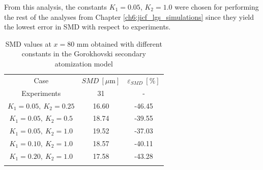 From this analysis, the constants $K_1 = 0.05$, $K_2 = 1.0$ were chosen for performing the rest of the analyses from Chapter \ref{ch6:jicf_lgs_simulations} since they yield the lowest error in SMD with respect to experiments. 




\begin{table}[!h]
\centering
\caption{SMD values at $x = 80$ mm obtained with different constants in the Gorokhovski secondary atomization model}
\begin{tabular}{ccc}
\thickhline
Case & $SMD~\left[\mu \mathrm{m} \right]$ & $\varepsilon_{SMD}~\left[\% \right]$ \\
\thickhline
Experiments & 31 & - \\
$K_1 = 0.05,~K_2 = 0.25$ & 16.60 & -46.45 \\
$K_1 = 0.05,~K_2 = 0.5$ & 18.74 & -39.55 \\
$K_1 = 0.05,~K_2 = 1.0$ & 19.52 & -37.03 \\
$K_1 = 0.10,~K_2 = 1.0$ & 18.57 & -40.11 \\
$K_1 = 0.20,~K_2 = 1.0$ & 17.58 & -43.28 \\
\thickhline
\end{tabular}
\label{tab:SMD_deviations_Gorokhovski}
\end{table}



\clearpage


